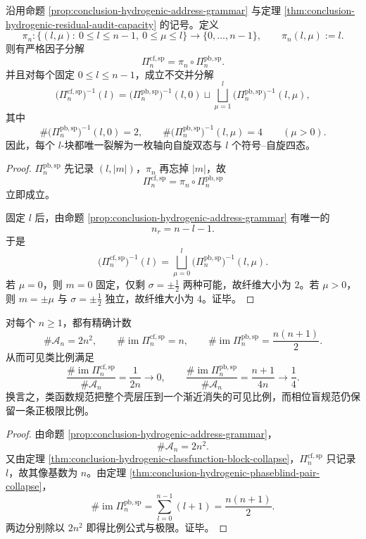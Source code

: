 \begin{theorem}[氢型壳层地址的严格二级规范塔]\label{thm:conclusion-hydrogenic-strict-twolevel-gauge-tower}
沿用命题 \ref{prop:conclusion-hydrogenic-address-grammar} 与定理 \ref{thm:conclusion-hydrogenic-residual-audit-capacity} 的记号。定义
\[
\pi_n:\{(l,\mu):\ 0\le l\le n-1,\ 0\le \mu\le l\}\to \{0,\dots,n-1\},
\qquad
\pi_n(l,\mu):=l.
\]
则有严格因子分解
\[
\Pi_n^{\mathrm{cf,sp}}
=
\pi_n\circ \Pi_n^{\mathrm{pb,sp}}.
\]
并且对每个固定 \(0\le l\le n-1\)，成立不交并分解
\[
\bigl(\Pi_n^{\mathrm{cf,sp}}\bigr)^{-1}(l)
=
\bigl(\Pi_n^{\mathrm{pb,sp}}\bigr)^{-1}(l,0)
\sqcup
\bigsqcup_{\mu=1}^{l}
\bigl(\Pi_n^{\mathrm{pb,sp}}\bigr)^{-1}(l,\mu),
\]
其中
\[
\#\bigl(\Pi_n^{\mathrm{pb,sp}}\bigr)^{-1}(l,0)=2,
\qquad
\#\bigl(\Pi_n^{\mathrm{pb,sp}}\bigr)^{-1}(l,\mu)=4
\qquad
(\mu>0).
\]
因此，每个 \(l\)-块都唯一裂解为一枚轴向自旋双态与 \(l\) 个符号--自旋四态。
\end{theorem}
\begin{proof}
\(\Pi_n^{\mathrm{pb,sp}}\) 先记录 \((l,|m|)\)，\(\pi_n\) 再忘掉 \(|m|\)，故
\[
\Pi_n^{\mathrm{cf,sp}}=\pi_n\circ \Pi_n^{\mathrm{pb,sp}}
\]
立即成立。

固定 \(l\) 后，由命题 \ref{prop:conclusion-hydrogenic-address-grammar} 有唯一的
\[
n_r=n-l-1.
\]
于是
\[
\bigl(\Pi_n^{\mathrm{cf,sp}}\bigr)^{-1}(l)
=
\bigsqcup_{\mu=0}^{l}\bigl(\Pi_n^{\mathrm{pb,sp}}\bigr)^{-1}(l,\mu).
\]
若 \(\mu=0\)，则 \(m=0\) 固定，仅剩 \(\sigma=\pm \tfrac12\) 两种可能，故纤维大小为 \(2\)。若 \(\mu>0\)，则 \(m=\pm\mu\) 与 \(\sigma=\pm\tfrac12\) 独立，故纤维大小为 \(4\)。证毕。
\end{proof}

\begin{corollary}[两级规范塌缩的可见类数与比例分裂]\label{cor:conclusion-hydrogenic-visible-class-ratio-splitting}
对每个 \(n\ge 1\)，都有精确计数
\[
\#\mathcal A_n=2n^2,
\qquad
\#\operatorname{im}\Pi_n^{\mathrm{cf,sp}}=n,
\qquad
\#\operatorname{im}\Pi_n^{\mathrm{pb,sp}}=\frac{n(n+1)}{2}.
\]
从而可见类比例满足
\[
\frac{\#\operatorname{im}\Pi_n^{\mathrm{cf,sp}}}{\#\mathcal A_n}
=
\frac{1}{2n}\longrightarrow 0,
\qquad
\frac{\#\operatorname{im}\Pi_n^{\mathrm{pb,sp}}}{\#\mathcal A_n}
=
\frac{n+1}{4n}\longrightarrow \frac14.
\]
换言之，类函数规范把整个壳层压到一个渐近消失的可见比例，而相位盲规范仍保留一条正极限比例。
\end{corollary}
\begin{proof}
由命题 \ref{prop:conclusion-hydrogenic-address-grammar}，
\[
\#\mathcal A_n=2n^2.
\]
又由定理 \ref{thm:conclusion-hydrogenic-classfunction-block-collapse}，\(\Pi_n^{\mathrm{cf,sp}}\) 只记录 \(l\)，故其像基数为 \(n\)。由定理 \ref{thm:conclusion-hydrogenic-phaseblind-pair-collapse}，
\[
\#\operatorname{im}\Pi_n^{\mathrm{pb,sp}}
=
\sum_{l=0}^{n-1}(l+1)
=
\frac{n(n+1)}{2}.
\]
两边分别除以 \(2n^2\) 即得比例公式与极限。证毕。
\end{proof}


